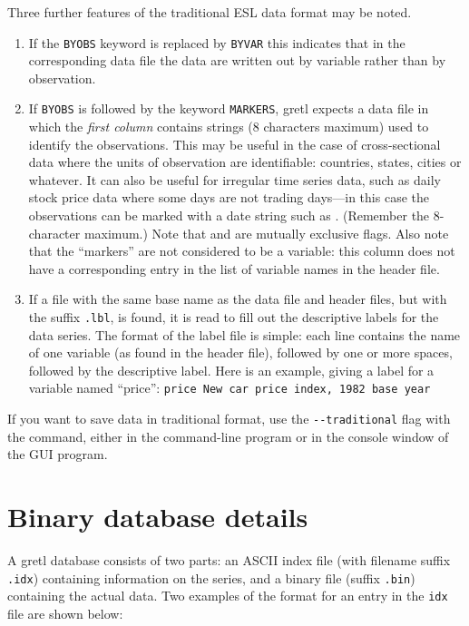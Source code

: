 Three further features of the traditional ESL data format may be
noted.
    
\begin{enumerate}
\item If the \verb+BYOBS+ keyword is replaced by \verb+BYVAR+ this
  indicates that in the corresponding data file the data are written
  out by variable rather than by observation.
\item If \verb+BYOBS+ is followed by the keyword \verb+MARKERS+,
  gretl expects a data file in which the \emph{first column}
  contains strings (8 characters maximum) used to identify the
  observations.  This may be useful in the case of cross-sectional data
  where the units of observation are identifiable: countries, states,
  cities or whatever.  It can also be useful for irregular time series
  data, such as daily stock price data where some days are not trading
  days---in this case the observations can be marked with a date
  string such as .  (Remember the 8-character maximum.)
  Note that  and  are mutually exclusive
  flags.  Also note that the ``markers'' are not considered to be a
  variable: this column does not have a corresponding entry in the
  list of variable names in the header file.
\item If a file with the same base name as the data file and header
  files, but with the suffix \verb+.lbl+, is found, it is read to fill
  out the descriptive labels for the data series. The format of the
  label file is simple: each line contains the name of one variable
  (as found in the header file), followed by one or more spaces,
  followed by the descriptive label. Here is an example, giving
  a label for a variable named ``price'':
  \verb+price New car price index, 1982 base year+
\end{enumerate}

If you want to save data in traditional format, use the
\verb|--traditional| flag with the  command, either in the
command-line program or in the console window of the GUI program.


\section{Binary database details}
\label{dbdetails}

A gretl database consists of two parts: an ASCII index file
(with filename suffix \verb+.idx+) containing information on the
series, and a binary file (suffix \verb+.bin+) containing the actual
data.  Two examples of the format for an entry in the \verb+idx+ file
are shown below:

